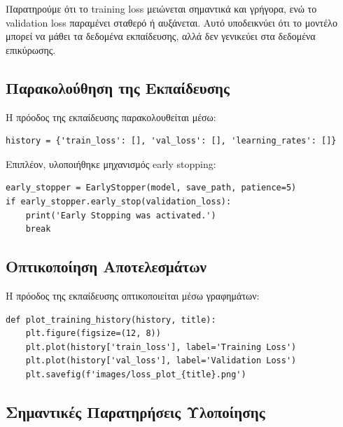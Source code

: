 \documentclass[a4paper,12pt]{article}
\begin{document}
Παρατηρούμε ότι το training loss μειώνεται σημαντικά και γρήγορα, ενώ το validation loss παραμένει σταθερό ή αυξάνεται. 
Αυτό υποδεικνύει ότι το μοντέλο μπορεί να μάθει τα δεδομένα εκπαίδευσης, αλλά δεν γενικεύει στα δεδομένα επικύρωσης.

\subsection*{Παρακολούθηση της Εκπαίδευσης}

Η πρόοδος της εκπαίδευσης παρακολουθείται μέσω:

\begin{verbatim}
history = {'train_loss': [], 'val_loss': [], 'learning_rates': []}
\end{verbatim}

Επιπλέον, υλοποιήθηκε μηχανισμός early stopping:

\begin{verbatim}
early_stopper = EarlyStopper(model, save_path, patience=5)
if early_stopper.early_stop(validation_loss):
    print('Early Stopping was activated.')
    break
\end{verbatim}

\subsection*{Οπτικοποίηση Αποτελεσμάτων}

Η πρόοδος της εκπαίδευσης οπτικοποιείται μέσω γραφημάτων:

\begin{verbatim}
def plot_training_history(history, title):
    plt.figure(figsize=(12, 8))
    plt.plot(history['train_loss'], label='Training Loss')
    plt.plot(history['val_loss'], label='Validation Loss')
    plt.savefig(f'images/loss_plot_{title}.png')
\end{verbatim}

\subsection*{Σημαντικές Παρατηρήσεις Υλοποίησης}
\end{document}

